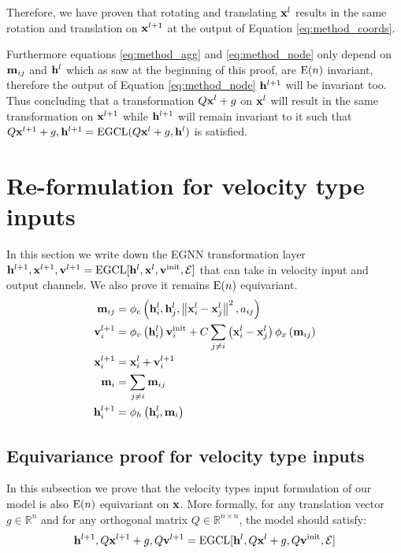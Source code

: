 Therefore, we have proven that rotating and translating $\mathbf{x}^l$ results in the same rotation and translation on $\mathbf{x}^{l+1}$ at the output of Equation \ref{eq:method_coords}.

Furthermore equations \ref{eq:method_agg} and \ref{eq:method_node} only depend on $\mathbf{m}_{ij}$ and $\mathbf{h}^l$ which as saw at the beginning of this proof, are $\mathrm{E}(n)$ invariant, therefore the output of Equation \ref{eq:method_node} $\mathbf{h}^{l+1}$ will be invariant too. Thus concluding that a transformation $Q\mathbf{x}^l +g$ on $\mathbf{x}^l$ will result in the same transformation on $\mathbf{x}^{l+1}$ while $\mathbf{h}^{l+1}$ will remain invariant to it such that $Q\mathbf{x}^{l+1} + g, \mathbf{h}^{l+1}  = \mathrm{EGCL}(Q\mathbf{x}^l + g, \mathbf{h}^l)$ is satisfied.

\section{Re-formulation for velocity type inputs} \label{sec:appendix:method_velocity}

In this section we write down the EGNN transformation layer $\mathbf{h}^{l+1}, \mathbf{x}^{l+1}, \mathbf{v}^{l+1} = \text{EGCL}[\mathbf{h}^{l}, \mathbf{x}^{l}, \mathbf{v}^{\text{init}}, \mathcal{E}]$ that can take in velocity input and output channels. We also prove it remains $\mathrm{E}(n)$ equivariant. %
\begin{align*}
\mathbf{m}_{i j} &=\phi_{e}\left(\mathbf{h}_{i}^{l}, \mathbf{h}_{j}^{l},\left\|\mathbf{x}_{i}^{l}-\mathbf{x}_{j}^{l}\right\|^{2}, a_{i j}\right) \\ 
 \mathbf{v}_{i}^{l+1}&= \phi_{v}\left(\mathbf{h}_{i}^l\right)\mathbf{v}_{i}^{\text{init}} +C\sum_{j \neq i}\left(\mathbf{x}_{i}^{l}-\mathbf{x}_{j}^{l}\right) \phi_{x}\left(\mathbf{m}_{i j}\right) \\
\mathbf{x}_{i}^{l+1} &=\mathbf{x}_{i}^{l}+ \mathbf{v}_i^{l+1} \\
\mathbf{m}_{i} &=\sum_{j \neq i} \mathbf{m}_{i j} \\
\mathbf{h}_{i}^{l+1} &=\phi_{h}\left(\mathbf{h}_{i}^l, \mathbf{m}_{i}\right)
\end{align*}
%
\subsection{Equivariance proof for velocity type inputs} \label{sec:appendix_equiv_proof_velocity}
In this subsection we prove that the velocity types input formulation of our model is also $\mathrm{E}(n)$ equivariant on $\mathbf{x}$. More formally, for any translation vector $g \in \mathbb{R}^n$ and for any orthogonal matrix $Q \in \mathbb{R}^{n \times n}$, the model should satisfy:
$$\mathbf{h}^{l+1}, Q\mathbf{x}^{l+1} + g, Q\mathbf{v}^{l+1} = \text{EGCL}[\mathbf{h}^{l}, Q\mathbf{x}^{l} + g, Q\mathbf{v}^{\text{init}}, \mathcal{E}]$$

